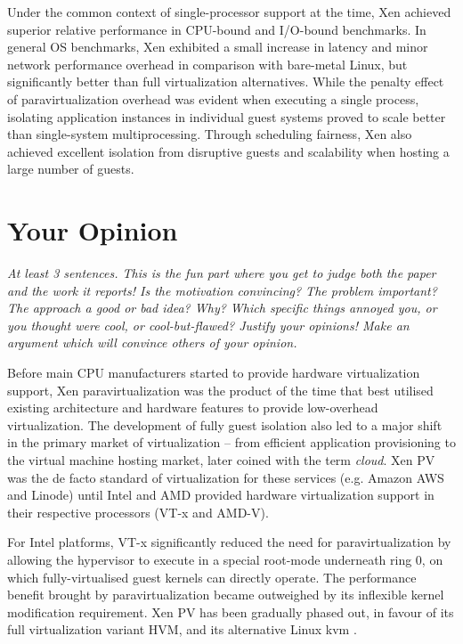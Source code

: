 \documentclass[11pt]{article}
\begin{document}
Under the common context of single-processor support at the time, Xen achieved superior relative performance in CPU-bound and I/O-bound benchmarks. In general OS benchmarks, Xen exhibited a small increase in latency and minor network performance overhead in comparison with bare-metal Linux, but significantly better than full virtualization alternatives. While the penalty effect of paravirtualization overhead was evident when executing a single process, isolating application instances in individual guest systems proved to scale better than single-system multiprocessing. Through scheduling fairness, Xen also achieved excellent isolation from disruptive guests and scalability when hosting a large number of guests. 

\section*{Your Opinion}
\textsl{At least 3 sentences. This is the fun part where you get to judge both the paper and the work it reports! Is the motivation convincing? The problem important? The approach a good or bad idea?  Why? Which specific things annoyed you, or you thought were cool, or cool-but-flawed? Justify your opinions! Make an argument which will convince others of your opinion.}

Before main CPU manufacturers started to provide hardware virtualization support, Xen paravirtualization was the product of the time that best utilised existing architecture and hardware features to provide low-overhead virtualization. The development of fully guest isolation also led to a major shift in the primary market of virtualization -- from efficient application provisioning to the virtual machine hosting market, later coined with the term \emph{cloud}. Xen PV was the de facto standard of virtualization for these services (e.g. Amazon AWS and Linode) until Intel and AMD provided hardware virtualization support in their respective processors (VT-x \cite{uhlig2005intel} and AMD-V). 

For Intel platforms, VT-x significantly reduced the need for paravirtualization by allowing the hypervisor to execute in a special root-mode underneath ring 0, on which fully-virtualised guest kernels can directly operate. The performance benefit brought by paravirtualization became outweighed by its inflexible kernel modification requirement. Xen PV has been gradually phased out, in favour of its full virtualization variant HVM, and its alternative Linux kvm \cite{graziano2011performance}.
\end{document}
